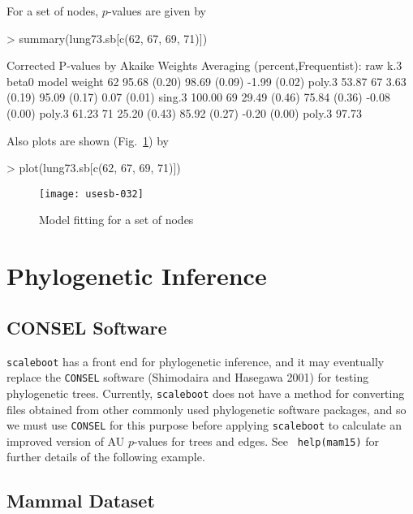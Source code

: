 \documentclass[a4paper]{amsart}
\begin{document}
For a set of nodes, $p$-values are given by
\begin{Schunk}
\begin{Sinput}
> summary(lung73.sb[c(62, 67, 69, 71)])
\end{Sinput}
\begin{Soutput}
Corrected P-values by Akaike Weights Averaging (percent,Frequentist):
   raw          k.3          beta0        model  weight 
62 95.68 (0.20) 98.69 (0.09) -1.99 (0.02) poly.3  53.87 
67  3.63 (0.19) 95.09 (0.17)  0.07 (0.01) sing.3 100.00 
69 29.49 (0.46) 75.84 (0.36) -0.08 (0.00) poly.3  61.23 
71 25.20 (0.43) 85.92 (0.27) -0.20 (0.00) poly.3  97.73 
\end{Soutput}
\end{Schunk}
Also plots are shown (Fig.~\ref{fig:lung73nodes}) by
\begin{Schunk}
\begin{Sinput}
> plot(lung73.sb[c(62, 67, 69, 71)])
\end{Sinput}
\end{Schunk}
\begin{figure}
\begin{center}
\texttt{[image: usesb-032]}
\caption{Model fitting for a set of nodes} \label{fig:lung73nodes}
\end{center}
\end{figure}

\section{Phylogenetic Inference}

\subsection{CONSEL Software}

{\tt scaleboot} has a front end for phylogenetic inference, and it may
eventually replace the {\tt CONSEL} software (Shimodaira and Hasegawa
2001) for testing phylogenetic trees. Currently, {\tt scaleboot} does
not have a method for converting files obtained from other commonly
used phylogenetic software packages, and so we must use {\tt CONSEL}
for this purpose before applying {\tt scaleboot} to calculate an
improved version of AU $p$-values for trees and edges.  See {\tt
help(mam15)} for further details of the following example.

\subsection{Mammal Dataset}
\end{document}
